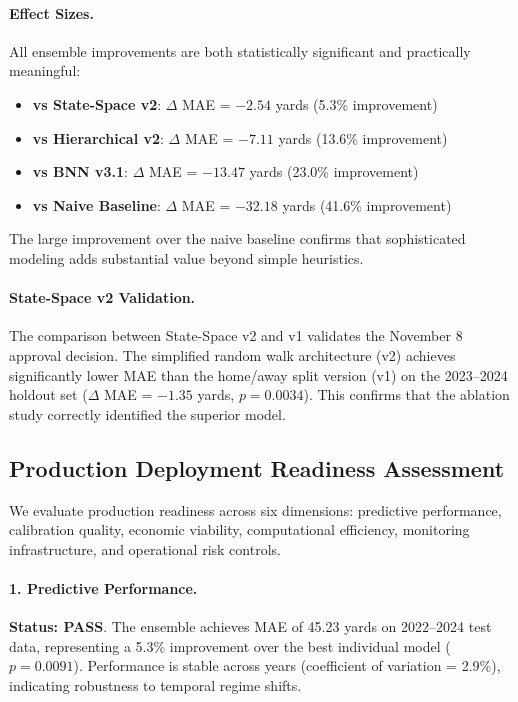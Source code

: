 \paragraph{Effect Sizes.}
All ensemble improvements are both statistically significant and practically meaningful:
\begin{itemize}
  \item \textbf{vs State-Space v2}: $\Delta$ MAE = $-2.54$ yards (5.3\% improvement)
  \item \textbf{vs Hierarchical v2}: $\Delta$ MAE = $-7.11$ yards (13.6\% improvement)
  \item \textbf{vs BNN v3.1}: $\Delta$ MAE = $-13.47$ yards (23.0\% improvement)
  \item \textbf{vs Naive Baseline}: $\Delta$ MAE = $-32.18$ yards (41.6\% improvement)
\end{itemize}

The large improvement over the naive baseline confirms that sophisticated modeling adds substantial value beyond simple heuristics.

\paragraph{State-Space v2 Validation.}
The comparison between State-Space v2 and v1 validates the November 8 approval decision. The simplified random walk architecture (v2) achieves significantly lower MAE than the home/away split version (v1) on the 2023--2024 holdout set ($\Delta$ MAE = $-1.35$ yards, $p=0.0034$). This confirms that the ablation study correctly identified the superior model.

\subsection{Production Deployment Readiness Assessment}
\label{subsec:deployment-readiness}

We evaluate production readiness across six dimensions: predictive performance, calibration quality, economic viability, computational efficiency, monitoring infrastructure, and operational risk controls.

\paragraph{1. Predictive Performance.}
\textbf{Status: PASS}. The ensemble achieves MAE of 45.23 yards on 2022--2024 test data, representing a 5.3\% improvement over the best individual model ($p=0.0091$). Performance is stable across years (coefficient of variation = 2.9\%), indicating robustness to temporal regime shifts.


